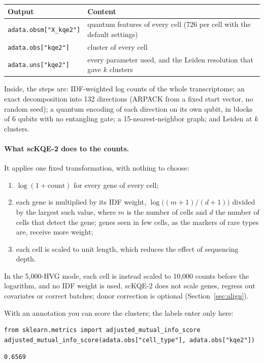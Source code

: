 \documentclass[11pt]{article}
\begin{document}
\begin{tabular}{@{}L{4.2cm}L{11cm}@{}}
\toprule
Output & Content\\
\midrule
\texttt{adata.obsm["X\_kqe2"]} & quantum features of every cell (726 per cell with the default settings)\\
\texttt{adata.obs["kqe2"]} & cluster of every cell\\
\texttt{adata.uns["kqe2"]} & every parameter used, and the Leiden resolution that gave $k$ clusters\\
\bottomrule
\end{tabular}

Inside, the steps are: IDF-weighted log counts of the whole transcriptome; an exact decomposition into 132 directions (ARPACK from a fixed start vector, no random seed); a quantum encoding of each direction on its own qubit, in blocks of 6 qubits with no entangling gate; a 15-nearest-neighbor graph; and Leiden at $k$ clusters.

\paragraph{What scKQE-2 does to the counts.} It applies one fixed transformation, with nothing to choose:
\begin{enumerate}
\item $\log(1 + \mathrm{count})$ for every gene of every cell;
\item each gene is multiplied by its IDF weight, $\log\big((m+1)/(d+1)\big)$ divided by the largest such value, where $m$ is the number of cells and $d$ the number of cells that detect the gene; genes seen in few cells, as the markers of rare types are, receive more weight;
\item each cell is scaled to unit length, which reduces the effect of sequencing depth.
\end{enumerate}
In the 5,000-HVG mode, each cell is instead scaled to 10,000 counts before the logarithm, and no IDF weight is used. scKQE-2 does not scale genes, regress out covariates or correct batches; donor correction is optional (Section~\ref{sec:align}).

With an annotation you can score the clusters; the labels enter only here:
\begin{lstlisting}
from sklearn.metrics import adjusted_mutual_info_score
adjusted_mutual_info_score(adata.obs["cell_type"], adata.obs["kqe2"])
\end{lstlisting}
\begin{lstlisting}[style=out]
0.6569
\end{lstlisting}
\end{document}
